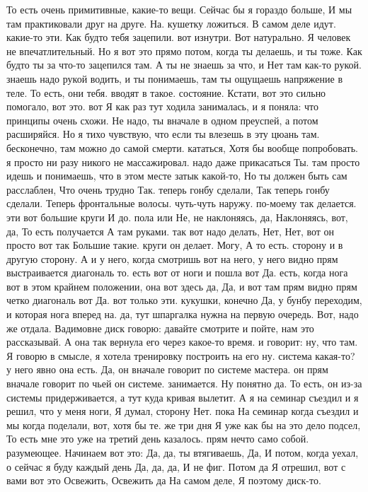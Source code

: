 То есть очень примитивные, какие-то вещи.
Сейчас бы я гораздо больше, И мы там практиковали друг на друге.
На.
кушетку ложиться. В самом деле идут.
какие-то эти.
Как будто тебя зацепили. вот изнутри.
Вот натурально.
Я человек не впечатлительный.
Но я вот это прямо потом, когда ты делаешь, и ты тоже.
Как будто ты за что-то зацепился там.
А ты не знаешь за что, и Нет там как-то рукой. знаешь надо рукой водить, и ты понимаешь, там ты ощущаешь напряжение в теле.
То есть, они тебя.
вводят в такое.
состояние. Кстати, вот это сильно помогало, вот это. вот Я как раз тут ходила занималась, и я поняла:
что принципы очень схожи.
Не надо, ты вначале в одном преуспей, а потом расширяйся. Но я тихо чувствую, что если
ты влезешь в эту цюань там.
бесконечно, там можно до самой смерти.
кататься, Хотя бы вообще попробовать. я просто ни разу никого не массажировал.
надо даже прикасаться Ты.
там просто идешь и понимаешь, что в
этом месте затык какой-то, Но ты должен быть сам расслаблен, Что очень трудно Так.
теперь гонбу сделали, Так теперь гонбу сделали. Теперь фронтальные волосы.
чуть-чуть наружу. по-моему так делается.
эти вот большие круги И до.
пола или Не, не наклоняясь, да, Наклоняясь, вот, да, То есть получается А там руками. так вот надо делать, Нет, Нет, вот он просто вот так Большие такие.
круги он делает. Могу, А то есть.
сторону и в другую сторону.
А и у него, когда смотришь вот на него, у него видно прям выстраивается диагональ то.
есть вот от ноги и пошла вот Да.
есть, когда нога вот в этом крайнем положении, она вот здесь да, Да, и вот там прям видно прям четко диагональ вот Да.
вот только эти.
кукушки, конечно Да, у бунбу переходим, и которая нога вперед на.
да, тут шпаргалка нужна на первую очередь.
Вот, надо же отдала.
Вадимовне диск говорю: давайте смотрите и пойте, нам это рассказывай. А она так вернула его через какое-то время.
и говорит: ну, что там.
Я говорю в смысле, я хотела тренировку построить на его ну.
система какая-то? у него явно она есть. Да, он вначале говорит по системе мастера. он прям вначале говорит по чьей он системе.
занимается. Ну понятно да. То есть, он из-за системы придерживается, а тут куда кривая вылетит.
А я на семинар съездил и я решил, что у меня ноги, Я думал, сторону Нет. пока На семинар когда съездил и мы когда поделали, вот,
хотя бы те.
же три дня Я уже как бы на это дело подсел, То есть мне это уже на третий день казалось.
прям нечто само собой.
разумеющее. Начинаем вот это: Да, да, ты втягиваешь, Да, И потом, когда уехал,
о сейчас я буду каждый день Да, да, да, И не фиг. Потом да Я отрешил, вот с вами вот это Освежить, Освежить да На самом деле, Я поэтому диск-то.

